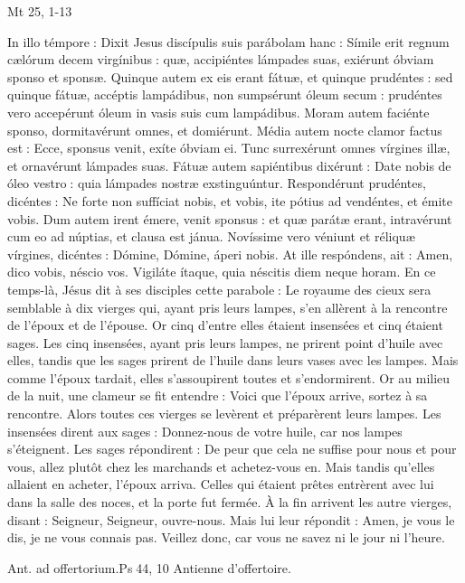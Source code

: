\begin{paracol}{2}
Mt 25, 1-13
\switchcolumn

\switchcolumn*

In illo témpore : Dixit Jesus discípulis  suis parábolam hanc : Símile erit regnum cælórum decem virgínibus : quæ, accipiéntes lámpades suas, exiérunt óbviam sponso et sponsæ. Quinque autem ex eis erant fátuæ, et quinque prudéntes : sed quinque fátuæ, accéptis lampádibus, non sumpsérunt óleum secum : prudéntes vero accepérunt óleum in vasis suis cum lampádibus. Moram autem faciénte sponso, dormitavérunt omnes, et domiérunt. Média autem nocte clamor factus est : Ecce, sponsus venit, exíte óbviam ei. Tunc surrexérunt omnes vírgines illæ, et ornavérunt lámpades suas. Fátuæ autem sapiéntibus dixérunt : Date nobis de óleo vestro : quia lámpades nostræ exstinguúntur. Respondérunt prudéntes, dicéntes : Ne forte non suffíciat nobis, et vobis, ite pótius ad vendéntes, et émite vobis. Dum autem irent émere, venit sponsus : et quæ parátæ erant, intravérunt cum eo ad núptias, et clausa est jánua. Novíssime vero véniunt et réliquæ vírgines, dicéntes : Dómine, Dómine, áperi nobis. At ille respóndens, ait : Amen, dico vobis, néscio vos. Vigiláte ítaque, quia néscitis diem neque horam.
\switchcolumn
En ce temps-là, Jésus dit à ses disciples  cette parabole : Le royaume des cieux sera semblable à dix vierges qui, ayant pris leurs lampes, s’en allèrent à la rencontre de l’époux et de l’épouse. Or cinq d’entre elles étaient insensées et cinq étaient sages. Les cinq insensées, ayant pris leurs lampes, ne prirent point d’huile avec elles, tandis que les sages prirent de l’huile dans leurs vases avec les lampes. Mais comme l’époux tardait, elles s’assoupirent toutes et s’endormirent. Or au milieu de la nuit, une clameur se fit entendre : Voici que l’époux arrive, sortez à sa rencontre. Alors toutes ces vierges se levèrent et préparèrent leurs lampes. Les insensées dirent aux sages : Donnez-nous de votre huile, car nos lampes s’éteignent. Les sages répondirent : De peur que cela ne suffise pour nous et pour vous, allez plutôt chez les marchands et achetez-vous en. Mais tandis qu’elles allaient en acheter, l’époux arriva. Celles qui étaient prêtes entrèrent avec lui dans la salle des noces, et la porte fut fermée. À la fin arrivent les autre vierges, disant : Seigneur, Seigneur, ouvre-nous. Mais lui leur répondit : Amen, je vous le dis, je ne vous connais pas. Veillez donc, car vous ne savez ni le jour ni l’heure.
\switchcolumn*

Ant. ad offertorium.\hfill Ps 44, 10
\switchcolumn
Antienne d’offertoire.
\switchcolumn*


\end{paracol}
